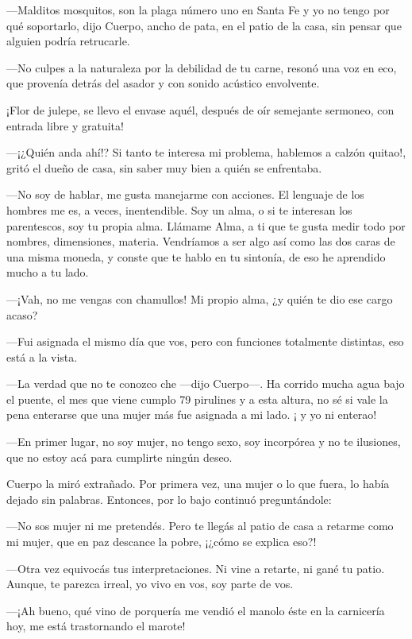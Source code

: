 \documentclass[11pt,twoside,openright,a5paper]{book}
\begin{document}
---Malditos mosquitos, son la plaga número uno en Santa Fe y yo no tengo por qué soportarlo, dijo Cuerpo, ancho de pata, en el patio de la casa, sin pensar que alguien podría retrucarle.

---No culpes a la naturaleza por la debilidad de tu carne, resonó una voz en eco, que provenía detrás del asador y con sonido acústico envolvente.

¡Flor de julepe, se llevo el envase aquél, después de oír semejante sermoneo, con entrada libre y gratuita!

---¡¿Quién anda ahí!? Si tanto te interesa mi problema, hablemos a calzón quitao!, gritó el dueño de casa, sin saber muy bien a quién se enfrentaba.

---No soy de hablar, me gusta manejarme con acciones. El lenguaje de los hombres me es, a veces, inentendible. Soy un alma, o si te interesan los parentescos, soy tu propia alma. Llámame Alma, a ti que te gusta medir todo por nombres, dimensiones, materia. Vendríamos a ser algo así como las dos caras de una misma moneda, y conste que te hablo en tu sintonía, de eso he aprendido mucho a tu lado.

---¡Vah, no me vengas con chamullos! Mi propio alma, ¿y quién te dio ese cargo acaso?

---Fui asignada el mismo día que vos, pero con funciones totalmente distintas, eso está a la vista.

---La verdad que no te conozco che ---dijo Cuerpo---. Ha corrido mucha agua bajo el puente, el mes que viene cumplo 79 pirulines y a esta altura, no sé si vale la pena enterarse que una mujer más fue asignada a mi lado. ¡ y yo ni enterao!

---En primer lugar, no soy mujer, no tengo sexo, soy incorpórea y no te ilusiones, que no estoy acá para cumplirte ningún deseo.

Cuerpo la miró extrañado. Por primera vez, una mujer o lo que fuera, lo había dejado sin palabras. Entonces, por lo bajo continuó preguntándole:

---No sos mujer ni me pretendés. Pero te llegás al patio de casa a retarme como mi mujer, que en paz descance la pobre, ¡¿cómo se explica eso?!

---Otra vez equivocás tus interpretaciones. Ni vine a retarte, ni gané tu patio. Aunque, te parezca irreal, yo vivo en vos, soy parte de vos.

---¡Ah bueno, qué vino de porquería me vendió el manolo éste en la carnicería hoy, me está trastornando el marote!
\end{document}
